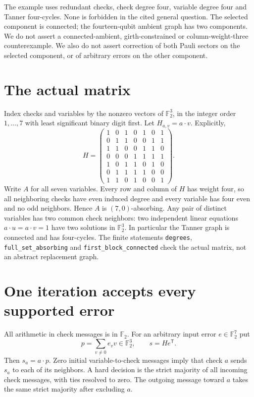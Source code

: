 \documentclass[11pt]{article}
\newcommand{\F}{\mathbb F_2}
\begin{document}
The example uses redundant checks, check degree four, variable degree four
and Tanner four-cycles. None is forbidden in the cited general question.
The selected component is connected; the fourteen-qubit ambient graph has
two components. We do not assert a connected-ambient, girth-constrained or
column-weight-three counterexample. We also do not assert correction of
both Pauli sectors on the selected component, or of arbitrary errors on
the other component.

\section{The actual matrix}
Index checks and variables by the nonzero vectors of $\F^3$, in the
integer order $1,\ldots,7$ with least significant binary digit first.
Let $H_{a,v}=a\cdot v$. Explicitly,
\begin{equation}\label{eq:H}
H=\begin{pmatrix}
1&0&1&0&1&0&1\\
0&1&1&0&0&1&1\\
1&1&0&0&1&1&0\\
0&0&0&1&1&1&1\\
1&0&1&1&0&1&0\\
0&1&1&1&1&0&0\\
1&1&0&1&0&0&1
\end{pmatrix}.
\end{equation}
Write $A$ for all seven variables. Every row and column of $H$ has weight
four, so all neighboring checks have even induced degree and every variable
has four even and no odd neighbors. Hence $A$ is $(7,0)$-absorbing.
Any pair of distinct variables has two common check neighbors: two independent
linear equations $a\cdot u=a\cdot v=1$ have two solutions in $\F^3$.
In particular the Tanner graph is connected and has four-cycles.
The finite statements \texttt{degrees}, \texttt{full\_set\_absorbing} and
\texttt{first\_block\_connected} check the actual matrix, not an abstract
replacement graph.

\section{One iteration accepts every supported error}\label{sec:decoding}
All arithmetic in check messages is in $\F$.
For an arbitrary input error $e\in\F^7$ put
\[
 p=\sum_{v\ne0}e_vv\in\F^3,\qquad s=He^{\mathsf T}.
\]
Then $s_a=a\cdot p$. Zero initial variable-to-check messages imply that
check $a$ sends $s_a$ to each of its neighbors. A hard decision is the
strict majority of all incoming check messages, with ties resolved to zero.
The outgoing message toward $a$ takes the same strict majority after
excluding $a$.
\end{document}
